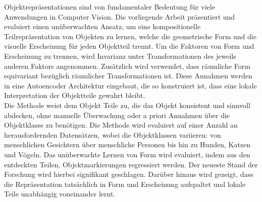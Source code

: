 Objektrepräsentationen sind von fundamentaler Bedeutung für viele Anwendungen in Computer Vision. Die vorliegende Arbeit präsentiert und evaluiert einen unüberwachten Ansatz, um eine kompositionelle Teilrepräsentation von Objekten zu lernen, welche die geometrische Form und die visuelle Erscheinung für jeden Objektteil trennt. Um die Faktoren von Form und Erscheinung zu trennen, wird Invarianz unter Transformationen des jeweils anderen Faktors angenommen. Zusätzlich wird verwendet, dass räumliche Form equivariant bezüglich räumlicher Transformationen ist. Diese Annahmen werden in eine Autoencoder Architektur eingebaut, die so konstruiert ist, dass eine lokale Interpretation der Objektteile gewahrt bleibt. \\
Die Methode weist dem Objekt Teile zu, die das Objekt konsistent und sinnvoll abdecken, ohne manuelle Überwachung oder a priori Annahmen über die Objektklasse zu benötigen.
Die Methode wird evaluiert auf einer Anzahl an herausfordernden Datensätzen, wobei die Objektklassen variieren: von menschlichen Gesichtern über menschliche Personen bis hin zu Hunden, Katzen und Vögeln. Das unüberwachte Lernen von Form wird evaluiert, indem aus den entdeckten Teilen, Objektmarkierungen regressiert werden. Der neueste Stand der Forschung wird hierbei signifikant geschlagen. Darüber hinaus wird gezeigt, dass die Repräsentation tatsächlich in Form und Erscheinung aufspaltet und lokale Teile unabhängig voneinander lernt.
